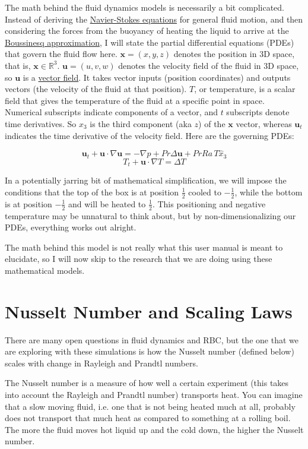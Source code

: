\documentclass[12pt,a4paper]{report}
\newcommand{\R}{\mathbb{R}}
\begin{document}
	The math behind the fluid dynamics models is necessarily a bit complicated. Instead of deriving the \href{https://en.wikipedia.org/wiki/Navier-Stokes_equations}{Navier-Stokes equations} for general fluid motion, and then considering the forces from the buoyancy of heating the liquid to arrive at the \href{https://en.wikipedia.org/wiki/Boussinesq_approximation_(buoyancy)}{Boussinesq approximation}, I will state the partial differential equations (PDEs) that govern the fluid flow here. $\mathbf{x} = (x, y, z)$ denotes the position in 3D space, that is, $\mathbf{x}\in \R^3$. $\mathbf{u} = (u, v, w)$ denotes the velocity field of the fluid in 3D space, so $\mathbf{u}$ is a \href{https://en.wikipedia.org/wiki/Vector_field}{vector field}. It takes vector inputs (position coordinates) and outputs vectors (the velocity of the fluid at that position). $T$, or temperature, is a scalar field that gives the temperature of the fluid at a specific point in space. Numerical subscripts indicate components of a vector, and $t$ subscripts denote time derivatives. So $x_3$ is the third component (aka $z$) of the $\mathbf{x}$ vector, whereas $\mathbf{u}_t$ indicates the time derivative of the velocity field. Here are the governing PDEs:

	$$\mathbf{u}_t + \mathbf{u}\cdot\nabla\mathbf{u}  = -\nabla p + Pr \Delta \mathbf{u} + PrRa\,T\hat{x}_3$$
	$$T_t + \mathbf{u}\cdot\nabla T = \Delta T$$

	In a potentially jarring bit of mathematical simplification, we will impose the conditions that the top of the box is at position $\frac{1}{2}$ cooled to $-\frac{1}{2}$, while the bottom is at position $-\frac{1}{2}$ and will be heated to $\frac{1}{2}$. This positioning and negative temperature may be unnatural to think about, but by non-dimensionalizing our PDEs, everything works out alright.

	The math behind this model is not really what this user manual is meant to elucidate, so I will now skip to the research that we are doing using these mathematical models.


\chapter{Nusselt Number and Scaling Laws}
	There are many open questions in fluid dynamics and RBC, but the one that we are exploring with these simulations is how the Nusselt number (defined below) scales with change in Rayleigh and Prandtl numbers.

	The Nusselt number is a measure of how well a certain experiment (this takes into account the Rayleigh and Prandtl number) transports heat. You can imagine that a slow moving fluid, i.e. one that is not being heated much at all, probably does not transport that much heat as compared to something at a rolling boil. The more the fluid moves hot liquid up and the cold down, the higher the Nusselt number.
	
\end{document}
